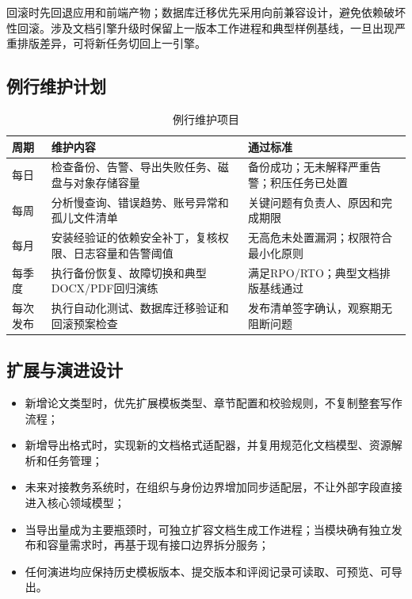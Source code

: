 \documentclass{../template/softeng}
\begin{document}
	回滚时先回退应用和前端产物；数据库迁移优先采用向前兼容设计，避免依赖破坏性回滚。涉及文档引擎升级时保留上一版本工作进程和典型样例基线，一旦出现严重排版差异，可将新任务切回上一引擎。
	
	\subsection{例行维护计划}
	\begin{table}[htbp]
		\centering
		\small
		\caption{例行维护项目}
		\begin{tabular}{p{2.0cm}p{6.0cm}p{4.0cm}}
			\toprule
			周期 & 维护内容 & 通过标准 \\
			\midrule
			每日 & 检查备份、告警、导出失败任务、磁盘与对象存储容量 & 备份成功；无未解释严重告警；积压任务已处置 \\
			每周 & 分析慢查询、错误趋势、账号异常和孤儿文件清单 & 关键问题有负责人、原因和完成期限 \\
			每月 & 安装经验证的依赖安全补丁，复核权限、日志容量和告警阈值 & 无高危未处置漏洞；权限符合最小化原则 \\
			每季度 & 执行备份恢复、故障切换和典型DOCX/PDF回归演练 & 满足RPO/RTO；典型文档排版基线通过 \\
			每次发布 & 执行自动化测试、数据库迁移验证和回滚预案检查 & 发布清单签字确认，观察期无阻断问题 \\
			\bottomrule
		\end{tabular}
	\end{table}
	
	\subsection{扩展与演进设计}
	\begin{itemize}
		\item 新增论文类型时，优先扩展模板类型、章节配置和校验规则，不复制整套写作流程；
		\item 新增导出格式时，实现新的文档格式适配器，并复用规范化文档模型、资源解析和任务管理；
		\item 未来对接教务系统时，在组织与身份边界增加同步适配层，不让外部字段直接进入核心领域模型；
		\item 当导出量成为主要瓶颈时，可独立扩容文档生成工作进程；当模块确有独立发布和容量需求时，再基于现有接口边界拆分服务；
		\item 任何演进均应保持历史模板版本、提交版本和评阅记录可读取、可预览、可导出。
	\end{itemize}
	
\end{document}
